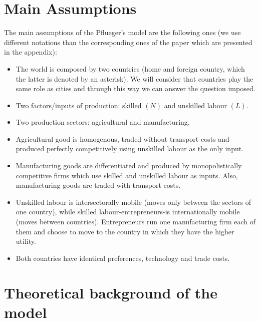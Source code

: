 \documentclass[11pt]{article}
\begin{document}
\section{Main Assumptions}
The main assumptions of the Pflueger's model are the following ones (we use different notations than the corresponding ones of the paper which are presented in the appendix):
\begin{itemize}
	\item The world is composed by two countries (home and foreign country, which the latter is denoted by an asterisk). We will consider that countries play the same role as cities and through this way we can answer the question imposed.
	\item Two factors/inputs of production: skilled $(N)$ and unskilled labour $(L)$.
	\item Two production sectors: agricultural and manufacturing.
	\item Agricultural good is homogenous, traded without transport costs and produced perfectly competitively using unskilled labour as the only input.
	\item Manufacturing goods are differentiated and produced by monopolistically competitive firms which use skilled and unskilled labour as inputs. Also, manufacturing goods are traded with transport costs.
	\item Unskilled labour is intersectorally mobile (moves only between the sectors of one country), while skilled labour-entrepreneurs-is internationally mobile (moves between countries). Entrepreneurs run one manufacturing firm each of them and choose to move to the country in which they have the higher utility.
	\item Both countries have identical preferences, technology and trade costs.
\end{itemize}
\section{Theoretical background of the model}
\end{document}
